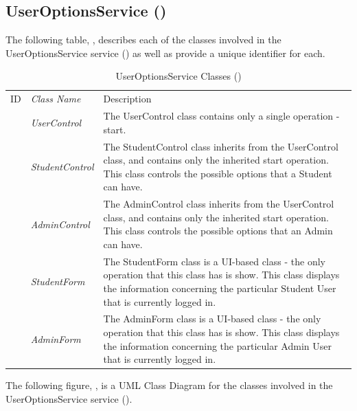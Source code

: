 \documentclass[12pt,letterpaper]{article}
\begin{document}
\subsection{UserOptionsService ()}

The following table, , describes each of the classes involved in the UserOptionsService service () as well as provide a unique identifier for each.
\begin{table}[H]
	\caption{UserOptionsService Classes ()} 
	\begin{tabu} to 
	    \tableheader{}ID & Class Name & Description \\
	     & UserControl & The UserControl class contains only a single operation - start.\\
	     & StudentControl & The StudentControl class inherits from the UserControl class, and contains only the inherited start operation. This class controls the possible options that a Student can have.\\
	     & AdminControl & The AdminControl class inherits from the UserControl class, and contains only the inherited start operation. This class controls the possible options that an Admin can have. \\
	     & StudentForm & The StudentForm class is a UI-based class - the only operation that this class has is show. This class displays the information concerning the particular Student User that is currently logged in.\\
	     & AdminForm & The AdminForm class is a UI-based class - the only operation that this class has is show. This class displays the information concerning the particular Admin User that is currently logged in.\\
	\end{tabu}
\end{table}

The following figure, , is a UML Class Diagram for the classes involved in the UserOptionsService service ().
\end{document}
